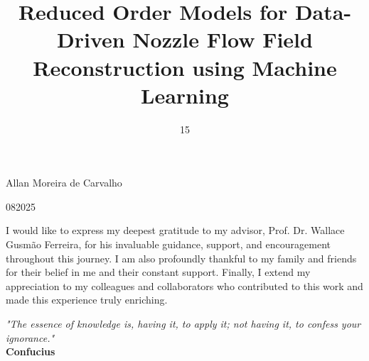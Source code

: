 \documentclass[tg, EN]{ufabcFHZh_tg}
\begin{document}
\title{Reduced Order Models for Data-Driven Nozzle Flow Field Reconstruction using Machine Learning}


\author{}{Allan Moreira de Carvalho}


\date{15}{08}{2025} %


\maketitle


\frontmatter

\dedication{To my familia, for their constant support and encouragement, and to my mentors, for their invaluable guidance and inspiration.}


\begin{agradecimentos}
    I would like to express my deepest gratitude to my advisor, Prof. Dr. Wallace Gusmão Ferreira, for his invaluable guidance, support, and encouragement throughout this journey. I am also profoundly thankful to my family and friends for their belief in me and their constant support. Finally, I extend my appreciation to my colleagues and collaborators who contributed to this work and made this experience truly enriching.
\end{agradecimentos}

\begin{epigrafe}
    \vspace*{\fill}
    \begin{flushright}
        \textit{"The essence of knowledge is, having it, to apply it; not having it, to confess your ignorance."} \\ 
        \textbf{Confucius}
    \end{flushright}
\end{epigrafe}
\end{document}
